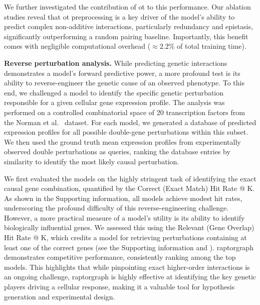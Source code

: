 We further investigated the contribution of \gls{ot} to this performance. Our ablation studies reveal that \gls{ot} preprocessing is a key driver of the model's ability to predict complex non-additive interactions, particularly redundancy and epistasis, significantly outperforming a random pairing baseline. Importantly, this benefit comes with negligible computational overhead ($\approx 2.2\%$ of total training time).

\textbf{Reverse perturbation analysis.} While predicting genetic interactions demonstrates a model's forward predictive power, a more profound test is its ability to reverse-engineer the genetic cause of an observed phenotype.
To this end, we challenged a model to identify the specific genetic perturbation responsible for a given cellular gene expression profile.
The analysis was performed on a controlled combinatorial space of 20 transcription factors from the Norman et al.~\cite{norman2019exploring} dataset.
For each model, we generated a database of predicted expression profiles for all possible double-gene perturbations within this subset.
We then used the ground truth mean expression profiles from experimentally observed double perturbations as queries, ranking the database entries by similarity to identify the most likely causal perturbation.

We first evaluated the models on the highly stringent task of identifying the exact causal gene combination, quantified by the Correct (Exact Match) Hit Rate @ K.
As shown in the Supporting information, all models achieve modest hit rates, underscoring the profound difficulty of this reverse-engineering challenge.
However, a more practical measure of a model's utility is its ability to identify biologically influential genes.
We assessed this using the Relevant (Gene Overlap) Hit Rate @ K, which credits a model for retrieving perturbations containing at least one of the correct genes (see the Supporting information and ).
\Gls{raptorgraph} demonstrates competitive performance, consistently ranking among the top models.
This highlights that while pinpointing exact higher-order interactions is an ongoing challenge, \gls{raptorgraph} is highly effective at identifying the key genetic players driving a cellular response, making it a valuable tool for hypothesis generation and experimental design.

